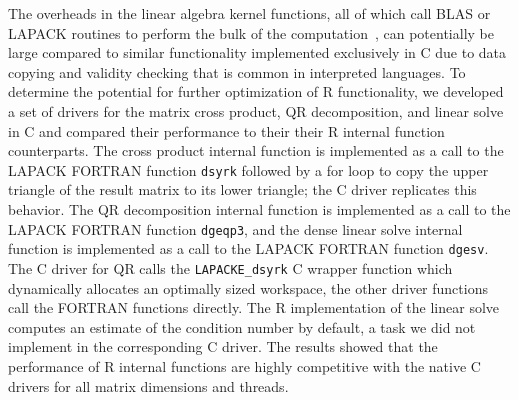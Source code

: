 The overheads in the linear algebra kernel functions, all of which call BLAS or
  LAPACK routines to perform the bulk of the computation~\cite{cran:Rmanuals},
  can potentially be large compared to similar functionality implemented
  exclusively in C due to data copying and validity checking that is common in
  interpreted languages.
To determine the potential for further optimization of R functionality, we
  developed a set of drivers for the matrix cross product, QR decomposition,
  and linear solve in C and compared their performance to their
  their R internal function counterparts.
The cross product internal function is implemented as a call to the LAPACK
  FORTRAN function \texttt{dsyrk} followed by a for loop to copy the upper
  triangle of the result matrix to its lower triangle; the C driver replicates
  this behavior.
The QR decomposition internal function is implemented as a call to the LAPACK
  FORTRAN function \texttt{dgeqp3}, and the dense linear solve internal function
  is implemented as a call to the LAPACK FORTRAN function \texttt{dgesv}.
The C driver for QR calls the \texttt{LAPACKE\_dsyrk} C wrapper function which
  dynamically allocates an optimally sized workspace, the other driver functions
  call the FORTRAN functions directly.
The R implementation of the linear solve computes an estimate of the
  condition number by default, a task we did not implement in the corresponding
  C driver.
The results showed that the performance of R internal functions are highly competitive
  with the native C drivers for all matrix dimensions and threads.

